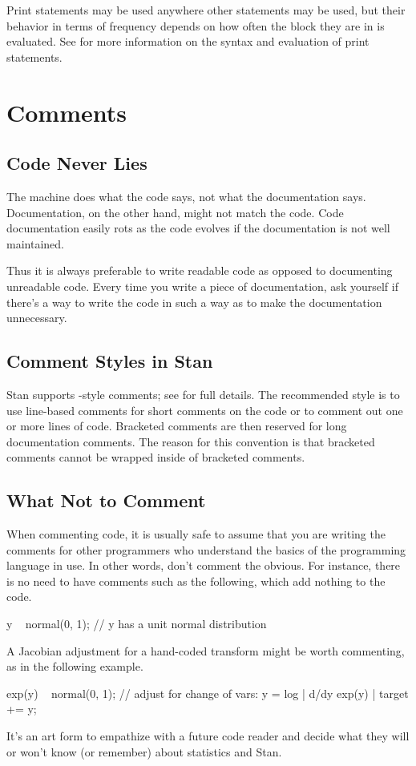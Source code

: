 Print statements may be used anywhere other statements may be used,
but their behavior in terms of frequency depends on how often the
block they are in is evaluated.  See  for
more information on the syntax and evaluation of print statements.



\section{Comments}\label{comments-programming.section}

\subsection{Code Never Lies}

The machine does what the code says, not what the documentation says.
Documentation, on the other hand, might not match the code.  Code
documentation easily rots as the code evolves if the documentation is
not well maintained.  

Thus it is always preferable to write readable code as opposed to
documenting unreadable code.  Every time you write a piece of
documentation, ask yourself if there's a way to write the code in such
a way as to make the documentation unnecessary.


\subsection{Comment Styles in Stan}

Stan supports \Cpp-style comments; see  for full
details.  The recommended style is to use line-based comments for
short comments on the code or to comment out one or more
lines of code.  Bracketed comments are then reserved for long
documentation comments.  The reason for this convention is that
bracketed comments cannot be wrapped inside of bracketed comments.

\subsection{What Not to Comment}

When commenting code, it is usually safe to assume that you are 
writing the comments for other programmers who understand the basics 
of the programming language in use.  In other words, don't comment the
obvious.  For instance, there is no need to have comments
such as the following, which add nothing to the code.
%
\begin{stancode}
y ~ normal(0, 1);  // y has a unit normal distribution
\end{stancode}
%
A Jacobian adjustment for a hand-coded transform might be worth
commenting, as in the following example.
%
\begin{stancode}
exp(y) ~ normal(0, 1);
// adjust for change of vars: y = log | d/dy exp(y) |
target += y;
\end{stancode}
%
It's an art form to empathize with a future code reader and decide
what they will or won't know (or remember) about statistics and Stan.

